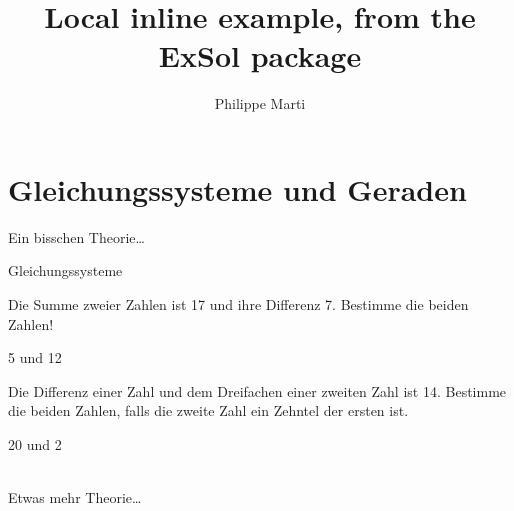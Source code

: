 \documentclass[11pt,a4paper]{article}
\title{Local inline example, from the \textsf{ExSol} package}
\author{Philippe Marti}
\begin{document}
\maketitle

\section{Gleichungssysteme und Geraden}

Ein bisschen Theorie\ldots

\begin{exerciseseries}[solsubrule=\hrule]{Gleichungssysteme}
  \begin{exercise}
    Die Summe zweier Zahlen ist 17 und ihre Differenz 7. Bestimme die
    beiden Zahlen!
  \end{exercise}
  \begin{solution}
    5 und 12
  \end{solution}

  \begin{exercise}
    Die Differenz einer Zahl und dem Dreifachen einer zweiten Zahl ist
    14. Bestimme die beiden Zahlen, falls die zweite Zahl ein Zehntel
    der ersten ist.
  \end{exercise}
  \begin{solution}
    20 und 2
  \end{solution}
\end{exerciseseries}
~\\
Etwas mehr Theorie\ldots
\end{document}
